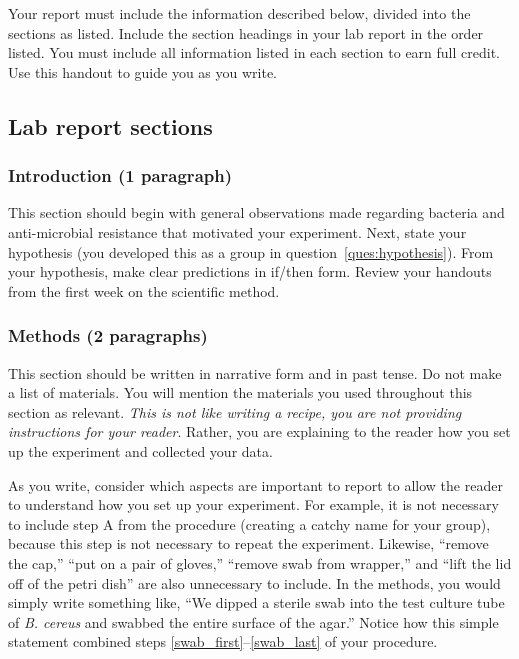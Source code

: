 \documentclass[12pt]{exam}
\begin{document}
Your report must include the information described below, divided into the
sections as listed. Include the section headings in your lab report in the order listed. You must 
include all information listed in each section to earn full credit. 
Use this handout to guide you as you write.

\subsection*{Lab report sections}

\subsubsection*{Introduction (1 paragraph)} 

This section should begin with general observations made regarding
bacteria and anti-microbial resistance that motivated your experiment.
Next, state your hypothesis (you developed this as a group in question~\ref{ques:hypothesis}).
From your hypothesis, make clear predictions in if/then form. Review your handouts from
the first week on the scientific method.

\subsubsection*{Methods (2 paragraphs)} 

This section should be written in narrative form and in past tense. Do
not make a list of materials. You will mention the materials you used
throughout this section as relevant. \emph{This is not like writing a
recipe, you are not providing instructions for your reader}. Rather, you
are explaining to the reader how you set up the experiment and collected
your data.

As you write, consider which aspects are important to report to allow
the reader to understand how you set up your experiment. For example, it
is not necessary to include step A from the procedure (creating a catchy
name for your group), because this step is not necessary to repeat the
experiment. Likewise, ``remove the cap,'' ``put on a pair of
gloves,'' ``remove swab from wrapper,'' and ``lift the lid off of the petri
dish'' are also unnecessary to include. In the methods, you would simply
write something like, ``We dipped a sterile swab into the test culture
tube of \emph{B. cereus} and swabbed the entire surface of the agar.''
Notice how this simple statement combined steps \ref{swab_first}–\ref{swab_last} of your procedure.
\end{document}
